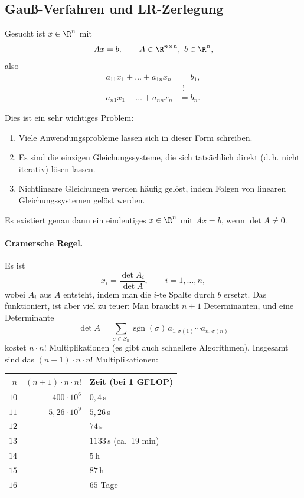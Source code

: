 \documentclass[11pt]{article}
\begin{document}
\subsection{Gauß-Verfahren und LR-Zerlegung}

Gesucht ist $x \in \R^n$ mit
\[ Ax = b, \qquad A \in \R^{n \times n},\ b \in \R^n, \]
also
\begin{align*}
  a_{11} x_1 + \dots + a_{1n} x_n &= b_1, \\
  &\ \,\vdots \\
  a_{n1} x_1 + \dots + a_{nn} x_n &= b_n.
\end{align*}

\begin{ergaenzung}
Dies ist ein sehr wichtiges Problem:
\begin{enumerate}[label=(\arabic*)]
  \item Viele Anwendungsprobleme lassen sich in dieser Form schreiben.
  \item Es sind die einzigen Gleichungssysteme, die sich tatsächlich direkt (d.\,h. nicht iterativ) lösen lassen.
  \item Nichtlineare Gleichungen werden häufig gelöst, indem Folgen von linearen Gleichungssystemen gelöst werden.
\end{enumerate}

\begin{theorem}[Lösbarkeit]\Theorem
  Es existiert genau dann ein eindeutiges $x \in \R^n$ mit $Ax = b$, wenn $\det A \neq 0$.
\end{theorem}

\paragraph{Cramersche Regel.}
Es ist
\[ x_i = \frac{\det A_i}{\det A}, \qquad i = 1, \dots, n, \]
wobei $A_i$ aus $A$ entsteht, indem man die $i$-te Spalte durch $b$ ersetzt. Das funktioniert, ist aber viel zu teuer: Man braucht $n + 1$ Determinanten, und eine Determinante
\[ \det A = \sum_{\sigma \in S_n} \operatorname{sgn}(\sigma)\, a_{1,\sigma(1)} \dotsm a_{n,\sigma(n)} \]
kostet $n \cdot n!$ Multiplikationen (es gibt auch schnellere Algorithmen). Insgesamt sind das $(n+1) \cdot n \cdot n!$ Multiplikationen:
\begin{center}
  \begin{tabular}{rrl}
    $n$ & $(n+1) \cdot n \cdot n!$ & Zeit (bei 1 GFLOP) \\ \hline
    $10$ & $400 \cdot 10^6$ & $0{,}4$\,s \\
    $11$ & $5{,}26 \cdot 10^9$ & $5{,}26$\,s \\
    $12$ & & $74$\,s \\
    $13$ & & $1133$\,s (ca.\ 19 min) \\
    $14$ & & $5$\,h \\
    $15$ & & $87$\,h \\
    $16$ & & $65$ Tage
  \end{tabular}
\end{center}


\end{ergaenzung}
\end{document}
